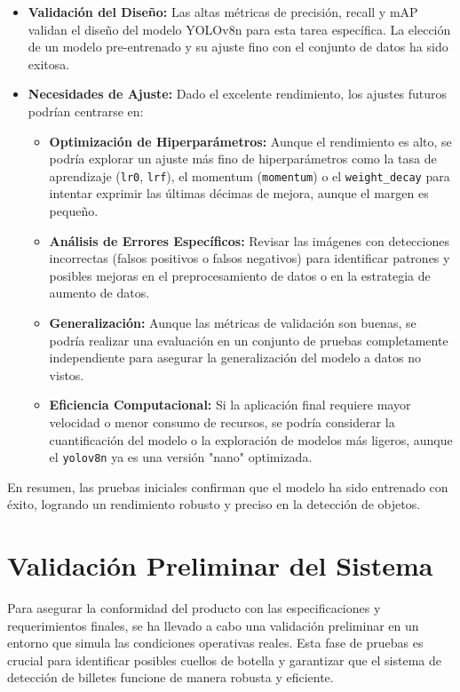 \documentclass[10pt,a4paper]{report}
\begin{document}
\begin{itemize}
    \item \textbf{Validación del Diseño:} Las altas métricas de precisión, recall y mAP validan el diseño del modelo YOLOv8n para esta tarea específica. La elección de un modelo pre-entrenado y su ajuste fino con el conjunto de datos ha sido exitosa.
    \item \textbf{Necesidades de Ajuste:} Dado el excelente rendimiento, los ajustes futuros podrían centrarse en:
    \begin{itemize}
        \item \textbf{Optimización de Hiperparámetros:} Aunque el rendimiento es alto, se podría explorar un ajuste más fino de hiperparámetros como la tasa de aprendizaje (\texttt{lr0}, \texttt{lrf}), el momentum (\texttt{momentum}) o el \texttt{weight\_decay} para intentar exprimir las últimas décimas de mejora, aunque el margen es pequeño.
        \item \textbf{Análisis de Errores Específicos:} Revisar las imágenes con detecciones incorrectas (falsos positivos o falsos negativos) para identificar patrones y posibles mejoras en el preprocesamiento de datos o en la estrategia de aumento de datos.
        \item \textbf{Generalización:} Aunque las métricas de validación son buenas, se podría realizar una evaluación en un conjunto de pruebas completamente independiente para asegurar la generalización del modelo a datos no vistos.
        \item \textbf{Eficiencia Computacional:} Si la aplicación final requiere mayor velocidad o menor consumo de recursos, se podría considerar la cuantificación del modelo o la exploración de modelos más ligeros, aunque el \texttt{yolov8n} ya es una versión "nano" optimizada.
    \end{itemize}
\end{itemize}

En resumen, las pruebas iniciales confirman que el modelo ha sido entrenado con éxito, logrando un rendimiento robusto y preciso en la detección de objetos.

\section{Validación Preliminar del Sistema}

Para asegurar la conformidad del producto con las especificaciones y requerimientos finales, se ha llevado a cabo una validación preliminar en un entorno que simula las condiciones operativas reales. Esta fase de pruebas es crucial para identificar posibles cuellos de botella y garantizar que el sistema de detección de billetes funcione de manera robusta y eficiente.
\end{document}
